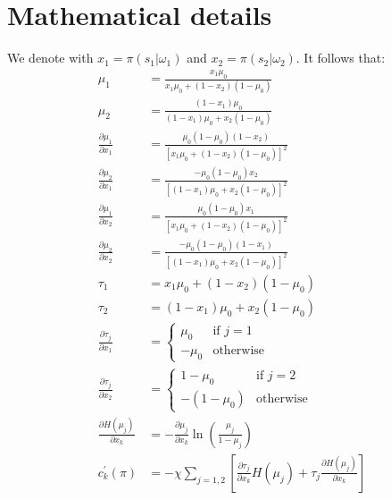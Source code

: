 \documentclass[12pt,a4paper]{article}
\begin{document}
\newpage



\appendix

\section{Mathematical details}
\label{math}
We denote with $x_1=\pi(s_1|\omega_1)$ and $x_2=\pi(s_2|\omega_2)$. It follows that:
\begin{align}
    \mu_1 & = \frac{x_1\mu_0}{x_1\mu_0 + (1-x_2)(1-\mu_0)} \\
    \mu_2 & = \frac{(1-x_1)\mu_0}{(1-x_1)\mu_0 + x_2(1-\mu_0)}\\
    \frac{\partial \mu_1}{\partial x_1} & =\frac{\mu_0(1-\mu_0)(1-x_2)}{[x_1\mu_0+(1-x_2)(1-\mu_0)]^2}\\
    \frac{\partial \mu_2}{\partial x_1} & =\frac{-\mu_0(1-\mu_0)x_2}{[(1-x_1)\mu_0+x_2(1-\mu_0)]^2}\\
    \frac{\partial \mu_1}{\partial x_2} & =\frac{\mu_0(1-\mu_0)x_1}{[x_1\mu_0+(1-x_2)(1-\mu_0)]^2}\\
    \frac{\partial \mu_2}{\partial x_2} & =\frac{-\mu_0(1-\mu_0)(1-x_1)}{[(1-x_1)\mu_0+x_2(1-\mu_0)]^2} \\
    \tau_1 & =x_1\mu_0 + (1-x_2)(1-\mu_0) \\
    \tau_2 & =(1-x_1)\mu_0 + x_2(1-\mu_0) \\
    \frac{\partial \tau_{j}}{\partial x_1} & = \left\{\begin{array}{ll}
        \mu_0 & \mbox{if } j = 1\\
        -\mu_0 & \mbox{otherwise}
        \end{array}\right. \\
        \frac{\partial \tau_{j}}{\partial x_2} & = \left\{\begin{array}{ll}
        1-\mu_0 & \mbox{if } j = 2\\
        -(1-\mu_0) & \mbox{otherwise}
        \end{array}\right. \\
    \frac{\partial H(\mu_{j})}{\partial x_k} & = -\frac{\partial \mu_j}{\partial x_k}\ln\left(\frac{\mu_j}{1-\mu_j}\right) \\
    c_k^\prime(\pi) & = -\chi \sum_{j=1,2} \left[\frac{\partial \tau_{j}}{\partial x_k}H(\mu_j) + \tau_{j}\frac{\partial H(\mu_j)}{\partial x_k}\right]
\end{align}
\end{document}
